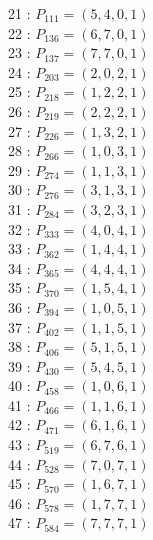 \documentclass{article}
\begin{document}
{\begin{multicols}{2}
21 : $P_{111}=( 5, 4, 0, 1 )$\\
22 : $P_{136}=( 6, 7, 0, 1 )$\\
23 : $P_{137}=( 7, 7, 0, 1 )$\\
24 : $P_{203}=( 2, 0, 2, 1 )$\\
25 : $P_{218}=( 1, 2, 2, 1 )$\\
26 : $P_{219}=( 2, 2, 2, 1 )$\\
27 : $P_{226}=( 1, 3, 2, 1 )$\\
28 : $P_{266}=( 1, 0, 3, 1 )$\\
29 : $P_{274}=( 1, 1, 3, 1 )$\\
30 : $P_{276}=( 3, 1, 3, 1 )$\\
31 : $P_{284}=( 3, 2, 3, 1 )$\\
32 : $P_{333}=( 4, 0, 4, 1 )$\\
33 : $P_{362}=( 1, 4, 4, 1 )$\\
34 : $P_{365}=( 4, 4, 4, 1 )$\\
35 : $P_{370}=( 1, 5, 4, 1 )$\\
36 : $P_{394}=( 1, 0, 5, 1 )$\\
37 : $P_{402}=( 1, 1, 5, 1 )$\\
38 : $P_{406}=( 5, 1, 5, 1 )$\\
39 : $P_{430}=( 5, 4, 5, 1 )$\\
40 : $P_{458}=( 1, 0, 6, 1 )$\\
41 : $P_{466}=( 1, 1, 6, 1 )$\\
42 : $P_{471}=( 6, 1, 6, 1 )$\\
43 : $P_{519}=( 6, 7, 6, 1 )$\\
44 : $P_{528}=( 7, 0, 7, 1 )$\\
45 : $P_{570}=( 1, 6, 7, 1 )$\\
46 : $P_{578}=( 1, 7, 7, 1 )$\\
47 : $P_{584}=( 7, 7, 7, 1 )$\\
\end{multicols}
}
\end{document}
